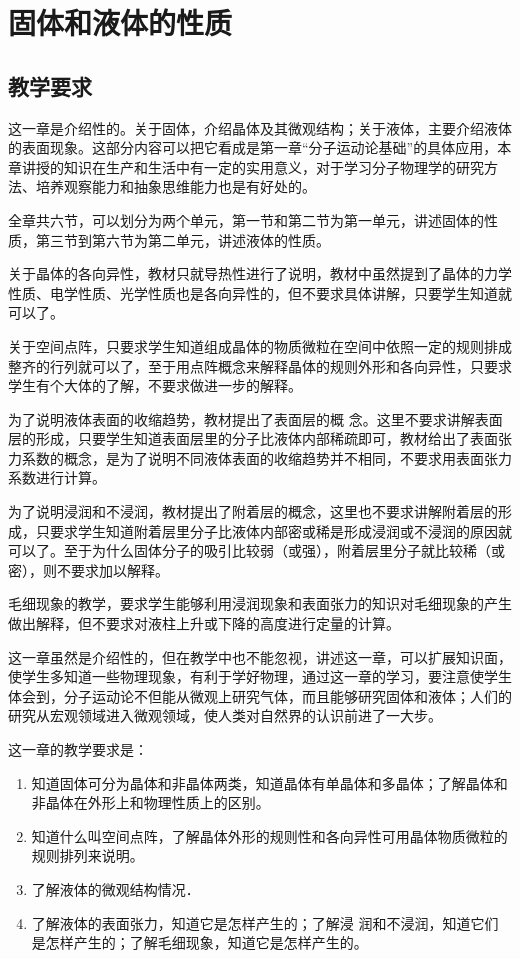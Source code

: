 \chapter{固体和液体的性质}


\section{教学要求}


这一章是介绍性的。关于固体，介绍晶体及其微观结构；关于液体，主要介绍液体的表面现象。这部分内容可以把它看成是第一章“分子运动论基础”的具体应用，本章讲授的知识在生产和生活中有一定的实用意义，对于学习分子物理学的研究方法、培养观察能力和抽象思维能力也是有好处的。

全章共六节，可以划分为两个单元，第一节和第二节为第一单元，讲述固体的性质，第三节到第六节为第二单元，讲述液体的性质。

关于晶体的各向异性，教材只就导热性进行了说明，教材中虽然提到了晶体的力学性质、电学性质、光学性质也是各向异性的，但不要求具体讲解，只要学生知道就可以了。

关于空间点阵，只要求学生知道组成晶体的物质微粒在空间中依照一定的规则排成整齐的行列就可以了，至于用点阵概念来解释晶体的规则外形和各向异性，只要求学生有个大体的了解，不要求做进一步的解释。

为了说明液体表面的收缩趋势，教材提出了表面层的概
念。这里不要求讲解表面层的形成，只要学生知道表面层里的分子比液体内部稀疏即可，教材给出了表面张力系数的概念，是为了说明不同液体表面的收缩趋势并不相同，不要求用表面张力系数进行计算。

为了说明浸润和不浸润，教材提出了附着层的概念，这里也不要求讲解附着层的形成，只要求学生知道附着层里分子比液体内部密或稀是形成浸润或不浸润的原因就可以了。至于为什么固体分子的吸引比较弱（或强），附着层里分子就比较稀（或密），则不要求加以解释。

毛细现象的教学，要求学生能够利用浸润现象和表面张力的知识对毛细现象的产生做出解释，但不要求对液柱上升或下降的高度进行定量的计算。

这一章虽然是介绍性的，但在教学中也不能忽视，讲述这一章，可以扩展知识面，使学生多知道一些物理现象，有利于学好物理，通过这一章的学习，要注意使学生体会到，分子运动论不但能从微观上研究气体，而且能够研究固体和液体；人们的研究从宏观领域进入微观领域，使人类对自然界的认识前进了一大步。

这一章的教学要求是：
\begin{enumerate}
\item 知道固体可分为晶体和非晶体两类，知道晶体有单晶体和多晶体；了解晶体和非晶体在外形上和物理性质上的区别。
\item 知道什么叫空间点阵，了解晶体外形的规则性和各向异性可用晶体物质微粒的规则排列来说明。
\item 了解液体的微观结构情况．
\item 了解液体的表面张力，知道它是怎样产生的；了解浸
润和不浸润，知道它们是怎样产生的；了解毛细现象，知道它是怎样产生的。
\end{enumerate}


